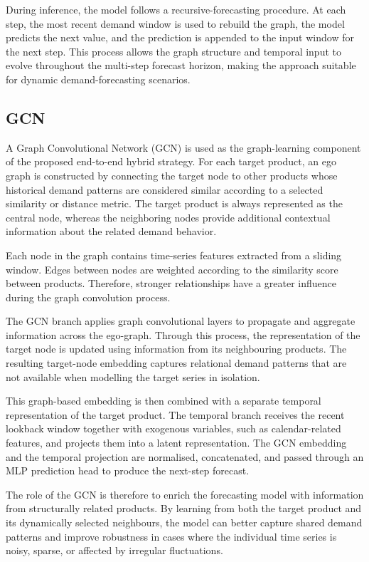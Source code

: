 During inference, the model follows a recursive-forecasting procedure. At each step, the most recent demand window is used to rebuild the graph, the model predicts the next value, and the prediction is appended to the input window for the next step. This process allows the graph structure and temporal input to evolve throughout the multi-step forecast horizon, making the approach suitable for dynamic demand-forecasting scenarios.

\subsection{GCN}

A Graph Convolutional Network (GCN) is used as the graph-learning component of the proposed end-to-end hybrid strategy. For each target product, an ego graph is constructed by connecting the target node to other products whose historical demand patterns are considered similar according to a selected similarity or distance metric. The target product is always represented as the central node, whereas the neighboring nodes provide additional contextual information about the related demand behavior.

Each node in the graph contains time-series features extracted from a sliding window. Edges between nodes are weighted according to the similarity score between products. Therefore, stronger relationships have a greater influence during the graph convolution process.

The GCN branch applies graph convolutional layers to propagate and aggregate information across the ego-graph. Through this process, the representation of the target node is updated using information from its neighbouring products. The resulting target-node embedding captures relational demand patterns that are not available when modelling the target series in isolation.

This graph-based embedding is then combined with a separate temporal representation of the target product. The temporal branch receives the recent lookback window together with exogenous variables, such as calendar-related features, and projects them into a latent representation. The GCN embedding and the temporal projection are normalised, concatenated, and passed through an MLP prediction head to produce the next-step forecast.

The role of the GCN is therefore to enrich the forecasting model with information from structurally related products. By learning from both the target product and its dynamically selected neighbours, the model can better capture shared demand patterns and improve robustness in cases where the individual time series is noisy, sparse, or affected by irregular fluctuations.

